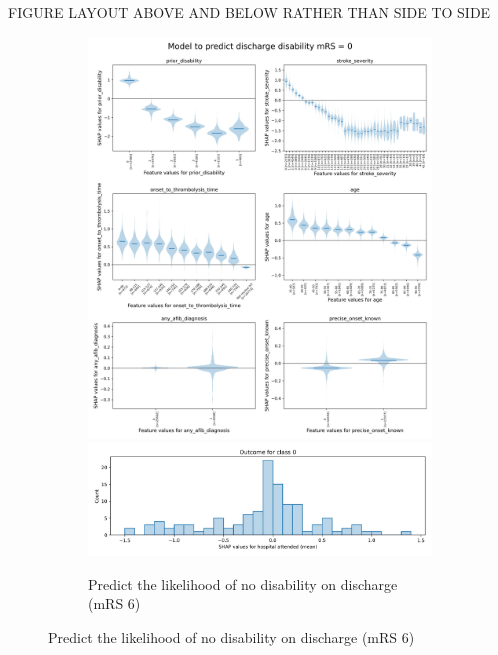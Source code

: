 FIGURE LAYOUT ABOVE AND BELOW RATHER THAN SIDE TO SIDE
\begin{figure}
    \centering
    \begin{subfigure}{1\textwidth}
      \centering
      \includegraphics[trim={0 0 0 1.2cm}, clip, width=1\linewidth]    {./images/053_xgb_7_features_1fold_999999_thrombolysis_shap_violin_all_features_for_mRS0}\\
      \includegraphics[trim={0 0 0 1cm}, clip, width=1\linewidth]    {./images/053_xgb_7_features_1fold_999999_hosp_shap_hist_mrs0}\\
      \caption{Predict the likelihood of no disability on discharge (mRS 6)}
      \label{fig:mrs_violin}
    \end{subfigure}%
\end{figure}
